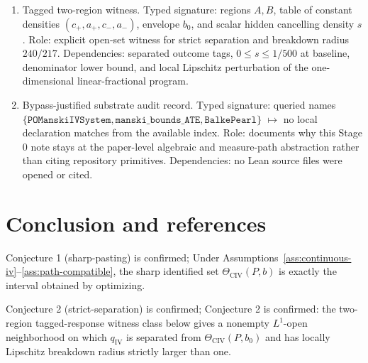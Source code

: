 \documentclass[11pt]{article}
\theoremstyle{definition}
\theoremstyle{plain}
\theoremstyle{remark}
\begin{document}
\begin{enumerate}[label=\arabic*.]
\item Tagged two-region witness.  Typed signature: regions \(A,B\), table of
constant densities \((c_+,a_+,c_-,a_-)\), envelope \(b_0\), and scalar hidden
cancelling density \(s\).  Role: explicit open-set witness for strict
separation and breakdown radius \(240/217\).  Dependencies: separated outcome
tags, \(0\le s\le1/500\) at baseline, denominator lower bound, and local
Lipschitz perturbation of the one-dimensional linear-fractional program.

\item Bypass-justified substrate audit record.  Typed signature: queried names
\(\{\texttt{POManskiIVSystem},\texttt{manski\_bounds\_ATE},\texttt{BalkePearl}\}\)
\(\mapsto\) no local declaration matches from the available index.  Role:
documents why this Stage 0 note stays at the paper-level algebraic and
measure-path abstraction rather than citing repository primitives.  Dependencies:
no Lean source files were opened or cited.
\end{enumerate}

\section{Conclusion and references}
Conjecture 1 (sharp-pasting) is confirmed; Under Assumptions~\ref{ass:continuous-iv}--\ref{ass:path-compatible}, the sharp identified set \(\Theta_{\mathrm{CIV}}(P,b)\) is exactly the interval obtained by optimizing.

Conjecture 2 (strict-separation) is confirmed; Conjecture 2 is confirmed: the two-region tagged-response witness class below gives a nonempty \(L^1\)-open neighborhood on which \(q_{\mathrm{IV}}\) is separated from \(\Theta_{\mathrm{CIV}}(P,b_0)\) and has locally Lipschitz breakdown radius strictly larger than one.
\end{document}
